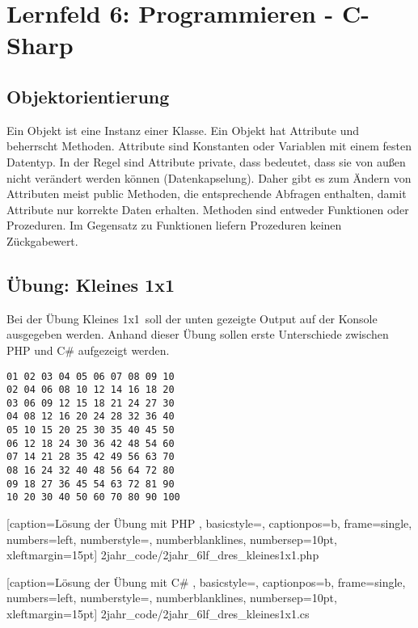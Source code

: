 \section{Lernfeld 6: Programmieren - C-Sharp}

\subsection{Objektorientierung}

Ein Objekt ist eine Instanz einer Klasse. Ein Objekt hat Attribute und beherrscht Methoden. Attribute sind Konstanten oder Variablen mit einem festen Datentyp. In der Regel sind Attribute private, dass bedeutet, dass sie von außen nicht verändert werden können (Datenkapselung). Daher gibt es zum Ändern von Attributen meist public Methoden, die entsprechende Abfragen enthalten, damit Attribute nur korrekte Daten erhalten. Methoden sind entweder Funktionen oder Prozeduren. Im Gegensatz zu Funktionen liefern Prozeduren keinen Zückgabewert.

\subsection{Übung: Kleines 1x1}

Bei der Übung \ql Kleines 1x1\qr\ soll der unten gezeigte Output auf der Konsole ausgegeben werden. Anhand dieser Übung sollen erste Unterschiede zwischen PHP und C\# aufgezeigt werden.

\begin{lstlisting}
01 02 03 04 05 06 07 08 09 10 
02 04 06 08 10 12 14 16 18 20 
03 06 09 12 15 18 21 24 27 30 
04 08 12 16 20 24 28 32 36 40 
05 10 15 20 25 30 35 40 45 50 
06 12 18 24 30 36 42 48 54 60 
07 14 21 28 35 42 49 56 63 70 
08 16 24 32 40 48 56 64 72 80 
09 18 27 36 45 54 63 72 81 90 
10 20 30 40 50 60 70 80 90 100
\end{lstlisting}


	[caption={Lösung der Übung mit PHP}
	\label{lst:6lf_dres_kleines1x1.php},
	basicstyle=\small,
	captionpos=b,
	frame=single,
	numbers=left,
	numberstyle=\small,
	numberblanklines,
	numbersep=10pt,
	xleftmargin=15pt]
	{2jahr_code/2jahr_6lf_dres_kleines1x1.php}
\newpage

	[caption={Lösung der Übung mit C\#}
	\label{lst:6lf_dres_kleines1x1.cs},
	basicstyle=\small,
	captionpos=b,
	frame=single,
	numbers=left,
	numberstyle=\small,
	numberblanklines,
	numbersep=10pt,
	xleftmargin=15pt]
	{2jahr_code/2jahr_6lf_dres_kleines1x1.cs}
	
